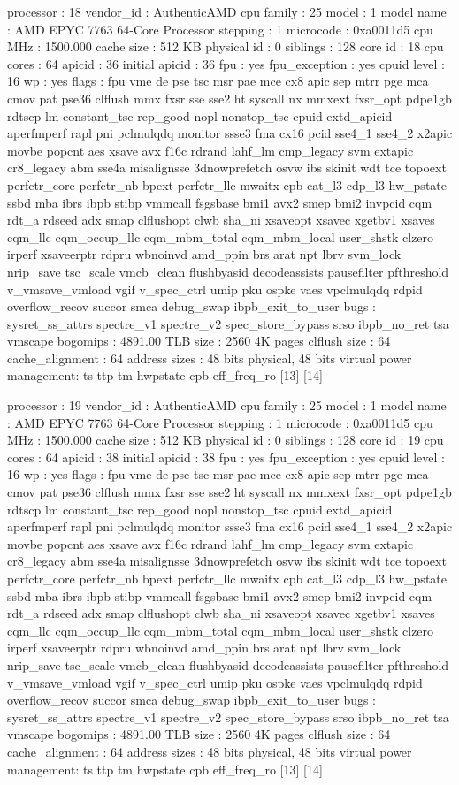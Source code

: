 processor	: 18
vendor_id	: AuthenticAMD
cpu family	: 25
model		: 1
model name	: AMD EPYC 7763 64-Core Processor
stepping	: 1
microcode	: 0xa0011d5
cpu MHz		: 1500.000
cache size	: 512 KB
physical id	: 0
siblings	: 128
core id		: 18
cpu cores	: 64
apicid		: 36
initial apicid	: 36
fpu		: yes
fpu_exception	: yes
cpuid level	: 16
wp		: yes
flags		: fpu vme de pse tsc msr pae mce cx8 apic sep mtrr pge mca cmov pat pse36 clflush mmx fxsr sse sse2 ht syscall nx mmxext fxsr_opt pdpe1gb rdtscp lm constant_tsc rep_good nopl nonstop_tsc cpuid extd_apicid aperfmperf rapl pni pclmulqdq monitor ssse3 fma cx16 pcid sse4_1 sse4_2 x2apic movbe popcnt aes xsave avx f16c rdrand lahf_lm cmp_legacy svm extapic cr8_legacy abm sse4a misalignsse 3dnowprefetch osvw ibs skinit wdt tce topoext perfctr_core perfctr_nb bpext perfctr_llc mwaitx cpb cat_l3 cdp_l3 hw_pstate ssbd mba ibrs ibpb stibp vmmcall fsgsbase bmi1 avx2 smep bmi2 invpcid cqm rdt_a rdseed adx smap clflushopt clwb sha_ni xsaveopt xsavec xgetbv1 xsaves cqm_llc cqm_occup_llc cqm_mbm_total cqm_mbm_local user_shstk clzero irperf xsaveerptr rdpru wbnoinvd amd_ppin brs arat npt lbrv svm_lock nrip_save tsc_scale vmcb_clean flushbyasid decodeassists pausefilter pfthreshold v_vmsave_vmload vgif v_spec_ctrl umip pku ospke vaes vpclmulqdq rdpid overflow_recov succor smca debug_swap ibpb_exit_to_user
bugs		: sysret_ss_attrs spectre_v1 spectre_v2 spec_store_bypass srso ibpb_no_ret tsa vmscape
bogomips	: 4891.00
TLB size	: 2560 4K pages
clflush size	: 64
cache_alignment	: 64
address sizes	: 48 bits physical, 48 bits virtual
power management: ts ttp tm hwpstate cpb eff_freq_ro [13] [14]

processor	: 19
vendor_id	: AuthenticAMD
cpu family	: 25
model		: 1
model name	: AMD EPYC 7763 64-Core Processor
stepping	: 1
microcode	: 0xa0011d5
cpu MHz		: 1500.000
cache size	: 512 KB
physical id	: 0
siblings	: 128
core id		: 19
cpu cores	: 64
apicid		: 38
initial apicid	: 38
fpu		: yes
fpu_exception	: yes
cpuid level	: 16
wp		: yes
flags		: fpu vme de pse tsc msr pae mce cx8 apic sep mtrr pge mca cmov pat pse36 clflush mmx fxsr sse sse2 ht syscall nx mmxext fxsr_opt pdpe1gb rdtscp lm constant_tsc rep_good nopl nonstop_tsc cpuid extd_apicid aperfmperf rapl pni pclmulqdq monitor ssse3 fma cx16 pcid sse4_1 sse4_2 x2apic movbe popcnt aes xsave avx f16c rdrand lahf_lm cmp_legacy svm extapic cr8_legacy abm sse4a misalignsse 3dnowprefetch osvw ibs skinit wdt tce topoext perfctr_core perfctr_nb bpext perfctr_llc mwaitx cpb cat_l3 cdp_l3 hw_pstate ssbd mba ibrs ibpb stibp vmmcall fsgsbase bmi1 avx2 smep bmi2 invpcid cqm rdt_a rdseed adx smap clflushopt clwb sha_ni xsaveopt xsavec xgetbv1 xsaves cqm_llc cqm_occup_llc cqm_mbm_total cqm_mbm_local user_shstk clzero irperf xsaveerptr rdpru wbnoinvd amd_ppin brs arat npt lbrv svm_lock nrip_save tsc_scale vmcb_clean flushbyasid decodeassists pausefilter pfthreshold v_vmsave_vmload vgif v_spec_ctrl umip pku ospke vaes vpclmulqdq rdpid overflow_recov succor smca debug_swap ibpb_exit_to_user
bugs		: sysret_ss_attrs spectre_v1 spectre_v2 spec_store_bypass srso ibpb_no_ret tsa vmscape
bogomips	: 4891.00
TLB size	: 2560 4K pages
clflush size	: 64
cache_alignment	: 64
address sizes	: 48 bits physical, 48 bits virtual
power management: ts ttp tm hwpstate cpb eff_freq_ro [13] [14]

